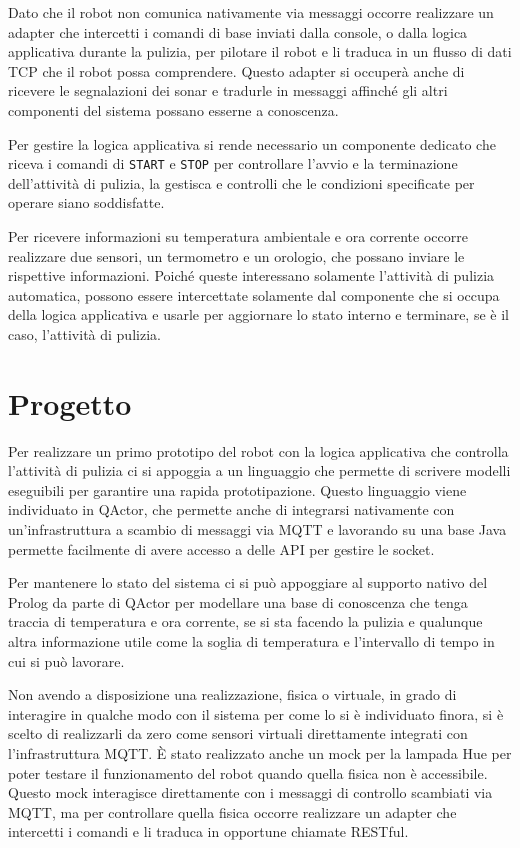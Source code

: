Dato che il robot non comunica nativamente via messaggi occorre realizzare un adapter che intercetti i comandi di base inviati dalla console, o dalla logica applicativa durante la pulizia, per pilotare il robot e li traduca in un flusso di dati TCP che il robot possa comprendere. Questo adapter si occuperà anche di ricevere le segnalazioni dei sonar e tradurle in messaggi affinché gli altri componenti del sistema possano esserne a conoscenza.

Per gestire la logica applicativa si rende necessario un componente dedicato che riceva i comandi di \texttt{START} e \texttt{STOP} per controllare l'avvio e la terminazione dell'attività di pulizia, la gestisca e controlli che le condizioni specificate per operare siano soddisfatte.

Per ricevere informazioni su temperatura ambientale e ora corrente occorre realizzare due sensori, un termometro e un orologio, che possano inviare le rispettive informazioni. Poiché queste interessano solamente l'attività di pulizia automatica, possono essere intercettate solamente dal componente che si occupa della logica applicativa e usarle per aggiornare lo stato interno e terminare, se è il caso, l'attività di pulizia.

\section{Progetto}
Per realizzare un primo prototipo del robot con la logica applicativa che controlla l'attività di pulizia ci si appoggia a un linguaggio che permette di scrivere modelli eseguibili per garantire una rapida prototipazione. Questo linguaggio viene individuato in QActor, che permette anche di integrarsi nativamente con un'infrastruttura a scambio di messaggi via MQTT e lavorando su una base Java permette facilmente di avere accesso a delle API per gestire le socket.

Per mantenere lo stato del sistema ci si può appoggiare al supporto nativo del Prolog da parte di QActor per modellare una base di conoscenza che tenga traccia di temperatura e ora corrente, se si sta facendo la pulizia e qualunque altra informazione utile come la soglia di temperatura e l'intervallo di tempo in cui si può lavorare.

Non avendo a disposizione una realizzazione, fisica o virtuale, in grado di interagire in qualche modo con il sistema per come lo si è individuato finora, si è scelto di realizzarli da zero come sensori virtuali direttamente integrati con l'infrastruttura MQTT. È stato realizzato anche un mock per la lampada Hue per poter testare il funzionamento del robot quando quella fisica non è accessibile. Questo mock interagisce direttamente con i messaggi di controllo scambiati via MQTT, ma per controllare quella fisica occorre realizzare un adapter che intercetti i comandi e li traduca in opportune chiamate RESTful.

